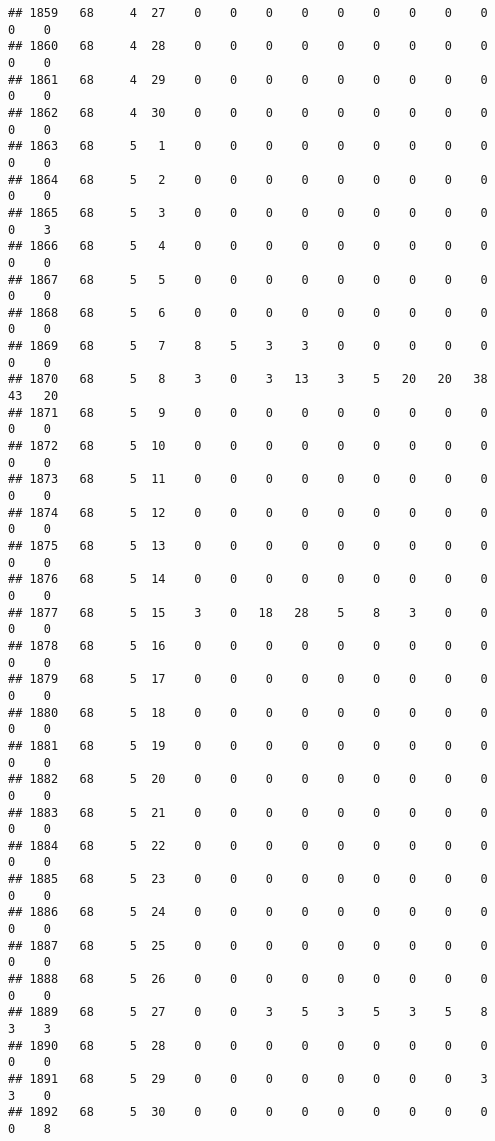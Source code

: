 \documentclass[]{article}
\begin{document}
\begin{verbatim}
## 1859   68     4  27    0    0    0    0    0    0    0    0    0    0    0
## 1860   68     4  28    0    0    0    0    0    0    0    0    0    0    0
## 1861   68     4  29    0    0    0    0    0    0    0    0    0    0    0
## 1862   68     4  30    0    0    0    0    0    0    0    0    0    0    0
## 1863   68     5   1    0    0    0    0    0    0    0    0    0    0    0
## 1864   68     5   2    0    0    0    0    0    0    0    0    0    0    0
## 1865   68     5   3    0    0    0    0    0    0    0    0    0    0    3
## 1866   68     5   4    0    0    0    0    0    0    0    0    0    0    0
## 1867   68     5   5    0    0    0    0    0    0    0    0    0    0    0
## 1868   68     5   6    0    0    0    0    0    0    0    0    0    0    0
## 1869   68     5   7    8    5    3    3    0    0    0    0    0    0    0
## 1870   68     5   8    3    0    3   13    3    5   20   20   38   43   20
## 1871   68     5   9    0    0    0    0    0    0    0    0    0    0    0
## 1872   68     5  10    0    0    0    0    0    0    0    0    0    0    0
## 1873   68     5  11    0    0    0    0    0    0    0    0    0    0    0
## 1874   68     5  12    0    0    0    0    0    0    0    0    0    0    0
## 1875   68     5  13    0    0    0    0    0    0    0    0    0    0    0
## 1876   68     5  14    0    0    0    0    0    0    0    0    0    0    0
## 1877   68     5  15    3    0   18   28    5    8    3    0    0    0    0
## 1878   68     5  16    0    0    0    0    0    0    0    0    0    0    0
## 1879   68     5  17    0    0    0    0    0    0    0    0    0    0    0
## 1880   68     5  18    0    0    0    0    0    0    0    0    0    0    0
## 1881   68     5  19    0    0    0    0    0    0    0    0    0    0    0
## 1882   68     5  20    0    0    0    0    0    0    0    0    0    0    0
## 1883   68     5  21    0    0    0    0    0    0    0    0    0    0    0
## 1884   68     5  22    0    0    0    0    0    0    0    0    0    0    0
## 1885   68     5  23    0    0    0    0    0    0    0    0    0    0    0
## 1886   68     5  24    0    0    0    0    0    0    0    0    0    0    0
## 1887   68     5  25    0    0    0    0    0    0    0    0    0    0    0
## 1888   68     5  26    0    0    0    0    0    0    0    0    0    0    0
## 1889   68     5  27    0    0    3    5    3    5    3    5    8    3    3
## 1890   68     5  28    0    0    0    0    0    0    0    0    0    0    0
## 1891   68     5  29    0    0    0    0    0    0    0    0    3    3    0
## 1892   68     5  30    0    0    0    0    0    0    0    0    0    0    8

\end{verbatim}
\end{document}
